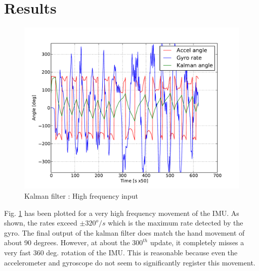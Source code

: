 \section{Results}
\begin{figure}[!h]
\centering
\includegraphics[scale=0.8]{fig/kalman_highfreq.pdf}
\caption{Kalman filter : High frequency input}
\label{fig:5_kalman_highfreq}
\end{figure}
Fig. \ref{fig:5_kalman_highfreq} has been plotted for a very high frequency movement of the IMU. As shown, the rates exceed 
$\pm320^o/s$ which is the maximum rate detected by the gyro. The final output of the kalman filter does match the hand movement
of about 90 degrees. However, at about the $300^{th}$ update, it completely misses a very fast 360 deg. rotation of the IMU. This
is reasonable because even the accelerometer and gyroscope do not seem to significantly register this movement.

